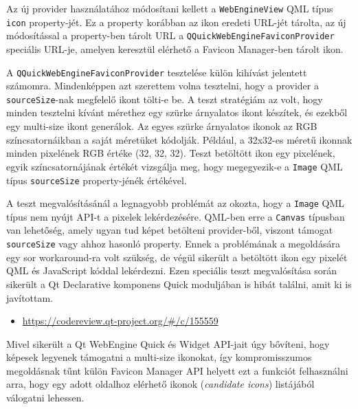 \documentclass[12pt]{report}
\let\origurl\url
\renewcommand{\url}[1]{%
    \textcolor{blue}{\origurl{#1}}
}
\newcommand{\gerrit}[1]{%
    \textcolor{qtgreen}{\origurl{https://codereview.qt-project.org/\#/c/#1}}
}
\begin{document}
Az új provider használatához módosítani kellett a \texttt{WebEngineView} QML típus
\texttt{icon} property-jét. Ez a property korábban az ikon eredeti URL-jét tárolta,
az új módosítással a property-ben tárolt URL a \texttt{QQuickWebEngineFaviconProvider}
speciális URL-je, amelyen keresztül elérhető a Favicon Manager-ben tárolt ikon.

A \texttt{QQuickWebEngineFaviconProvider} tesztelése külön kihívást jelentett számomra.
Mindenképpen azt szerettem volna tesztelni, hogy a provider a \texttt{sourceSize}-nak
megfelelő ikont tölti-e be. A teszt stratégiám az volt, hogy minden tesztelni kívánt mérethez
egy szürke árnyalatos ikont készítek, és ezekből egy multi-size ikont generálok. Az egyes
szürke árnyalatos ikonok az RGB színcsatornáikban a saját méretüket kódolják. Például, a
32x32-es méretű ikonnak minden pixelének RGB értéke (32, 32, 32). Teszt betöltött ikon
egy pixelének, egyik színcsatornájának értékét vizsgálja meg, hogy megegyezik-e
a \texttt{Image} QML típus \texttt{sourceSize} property-jénék értékével.

A teszt megvalósításánál a legnagyobb problémát az okozta, hogy a \texttt{Image} QML
típus nem nyújt API-t a pixelek lekérdezésére. QML-ben erre a \texttt{Canvas} típusban
van lehetőség, amely ugyan tud képet betölteni provider-ből, viszont támogat
\texttt{sourceSize} vagy ahhoz hasonló property. Ennek a problémának a megoldására egy
sor workaround-ra volt szükség, de végül sikerült a betöltött ikon egy pixelét QML és
JavaScript kóddal lekérdezni. Ezen speciális teszt megvalósítása során sikerült a
Qt Declarative komponens Quick moduljában is hibát találni, amit ki is javítottam.

\begin{center}
    \begin{reviewbox}
        \begin{itemize}
            \renewcommand{\labelitemi}{\textcolor{qtgreen}{$\blacktriangleright$}}
            \item \gerrit{155559}
        \end{itemize}
    \end{reviewbox}
\end{center}

Mivel sikerült a Qt WebEngine Quick és Widget API-jait úgy bővíteni, hogy képesek legyenek
támogatni a multi-size ikonokat, így kompromisszumos megoldásnak tűnt külön Favicon Manager
API helyett ezt a funkciót felhasználni arra, hogy egy adott oldalhoz elérhető ikonok
(\textit{candidate icons}) listájából válogatni lehessen.
\end{document}
